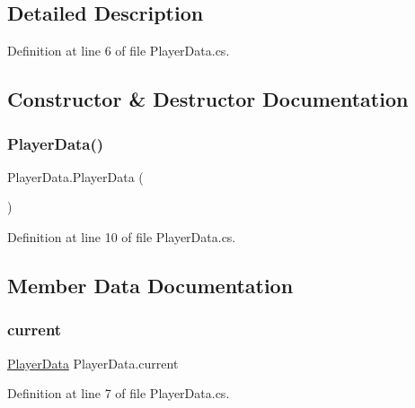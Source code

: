 \subsection{Detailed Description}


Definition at line 6 of file Player\+Data.\+cs.



\subsection{Constructor \& Destructor Documentation}
\mbox{\label{class_player_data_a7dc81cafeb02f4843f6c6ec738323ad9}} 
\subsubsection{\texorpdfstring{PlayerData()}{PlayerData()}}
{\footnotesize\ttfamily Player\+Data.\+Player\+Data (\begin{DoxyParamCaption}{ }\end{DoxyParamCaption})}



Definition at line 10 of file Player\+Data.\+cs.



\subsection{Member Data Documentation}
\mbox{\label{class_player_data_a56e50eb15fe325645f0a7206a53f3956}} 
\subsubsection{\texorpdfstring{current}{current}}
{\footnotesize\ttfamily \mbox{\hyperlink{class_player_data}{Player\+Data}} Player\+Data.\+current\hspace{0.3cm}{\ttfamily [static]}}



Definition at line 7 of file Player\+Data.\+cs.

\mbox{\label{class_player_data_ad3b89e484ba4ff9a3dcc3a477af1453a}} 
